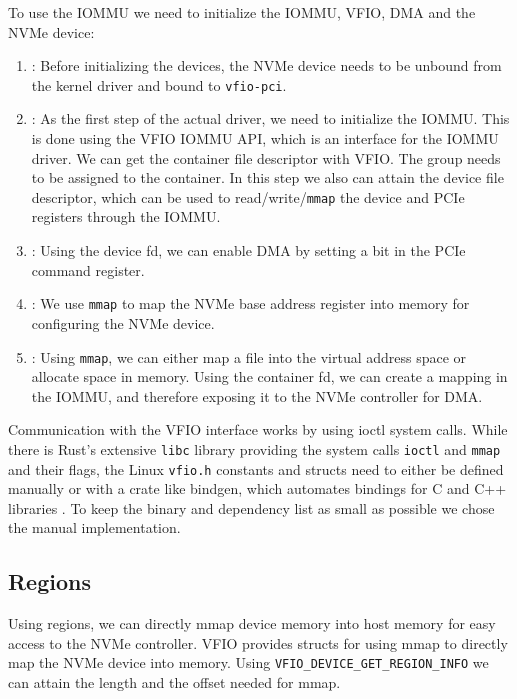 To use the IOMMU we need to initialize the IOMMU, VFIO, DMA and the NVMe device:
\begin{enumerate}
    \item \textbf{}: Before initializing the devices, the NVMe device needs to be unbound from the kernel driver and bound to \texttt{vfio-pci}.
    \item \textbf{}: As the first step of the actual driver, we need to initialize the IOMMU. This is done using the VFIO IOMMU API, which is an interface for the IOMMU driver. We can get the container file descriptor with VFIO. The group needs to be assigned to the container. In this step we also can attain the device file descriptor, which can be used to read/write/\texttt{mmap} the device and PCIe registers through the IOMMU.
    \item \textbf{}: Using the device fd, we can enable DMA by setting a bit in the PCIe command register.
    \item \textbf{}: We use \texttt{mmap} to map the NVMe base address register into memory for configuring the NVMe device.
    \item \textbf{}: Using \texttt{mmap}, we can either map a file into the virtual address space or allocate space in memory. Using the container fd, we can create a mapping in the IOMMU, and therefore exposing it to the NVMe controller for DMA.
\end{enumerate}

Communication with the VFIO interface works by using ioctl system calls.
While there is Rust's extensive \texttt{libc} library providing the system calls \texttt{ioctl} and \texttt{mmap} and their flags, the Linux \texttt{vfio.h} constants and structs need to either be defined manually or with a crate like bindgen, which automates bindings for C and C++ libraries \cite{cratebindgen}. To keep the binary and dependency list as small as possible we chose the manual implementation.

\subsection{Regions}
Using regions, we can directly mmap device memory into host memory for easy access to the NVMe controller.
VFIO provides structs for using mmap to directly map the NVMe device into memory. Using \texttt{VFIO\_DEVICE\_GET\_REGION\_INFO} we can attain the length and the offset needed for mmap.

